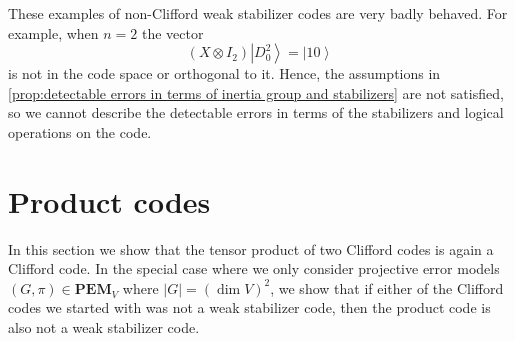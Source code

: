 \documentclass[11pt, oneside, reqno]{amsart}
\newcommand{\PEM}{\mathbf{PEM}}
\newcommand{\ket}[1]{\left|#1\right\rangle}
\theoremstyle{definition}
\theoremstyle{plain}
\theoremstyle{remark}
\begin{document}
These examples of non-Clifford weak stabilizer codes are very badly behaved. For example, when $n = 2$ the vector
\begin{equation*}
    (X \otimes I_2) \ket{D^2_0} = \ket{10}
\end{equation*}
is not in the code space or orthogonal to it. Hence, the assumptions in \cref{prop:detectable errors in terms of inertia group and stabilizers} are not satisfied, so we cannot describe the detectable errors in terms of the stabilizers and logical operations on the code.

\section{Product codes}\label{sec:Product codes}

In this section we show that the tensor product of two Clifford codes is again a Clifford code. In the special case where we only consider projective error models $(G,\pi) \in \PEM_V$ where $|G| = (\dim V)^2$, we show that if either of the Clifford codes we started with was not a weak stabilizer code, then the product code is also not a weak stabilizer code.
\end{document}
